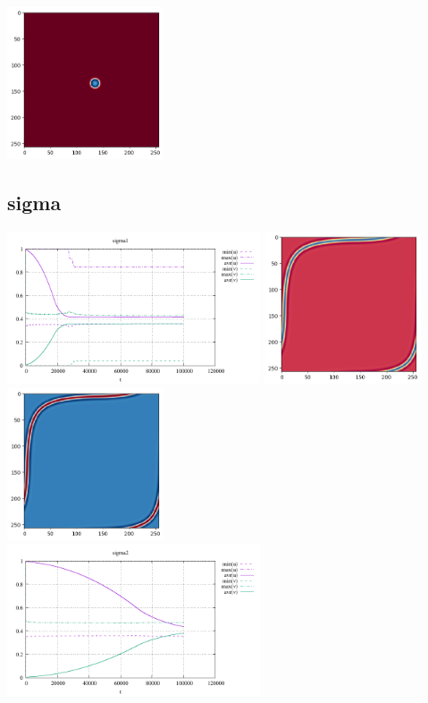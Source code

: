 \begin{center}
\includegraphics[height=4.5cm]{python_codes/fieldstone_171/results/rho2_solution_final_v.png}
\end{center}

\subsection*{sigma}
\begin{center}
\includegraphics[height=4.5cm]{python_codes/fieldstone_171/results/sigma1_stats}
\includegraphics[height=4.5cm]{python_codes/fieldstone_171/results/sigma1_solution_final_u.png}
\includegraphics[height=4.5cm]{python_codes/fieldstone_171/results/sigma1_solution_final_v.png}\\
\includegraphics[height=4.5cm]{python_codes/fieldstone_171/results/sigma2_stats}

\end{center}
